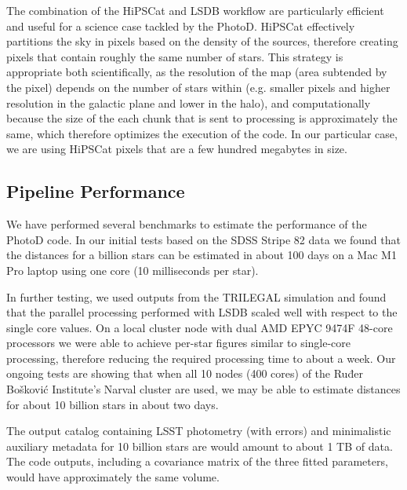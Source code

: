 


The combination of the HiPSCat and LSDB workflow are particularly efficient and useful for a science case tackled by the PhotoD. HiPSCat effectively partitions the sky in pixels based on the density of the sources, therefore creating pixels that contain roughly the same number of stars. This strategy is appropriate both scientifically, as the resolution of the map (area subtended by the pixel) depends on the number of stars within (e.g. smaller pixels and higher resolution in the galactic plane and lower in the halo), and computationally because the size of the each chunk that is sent to processing is approximately the same, which therefore optimizes the execution of the code. In our particular case, we are using HiPSCat pixels that are a few hundred megabytes in size.
 
 
\subsection{Pipeline Performance}

We have performed several benchmarks to estimate the performance of the PhotoD code. In our initial tests based on the SDSS Stripe 82 data we found that the distances for a billion stars can be estimated in about 100 days on a Mac M1 Pro laptop using one core (10 milliseconds per star). 

In further testing, we used outputs from the TRILEGAL simulation and found that the parallel processing performed with LSDB scaled well with respect to the single core values. On a local cluster node with dual AMD EPYC 9474F 48-core processors we were able to achieve per-star figures similar to single-core processing, therefore reducing the required processing time to about a week. Our ongoing tests are showing that when all 10 nodes (400 cores) of the Ruđer Bošković Institute's Narval cluster are used, we may be able to estimate distances for about 10 billion stars in about two days. 

The output catalog containing LSST photometry (with errors) and minimalistic auxiliary metadata for 10 billion stars are would amount to about 1 TB of data. The code outputs, including a covariance matrix of the three fitted parameters, would have approximately the same volume. 
